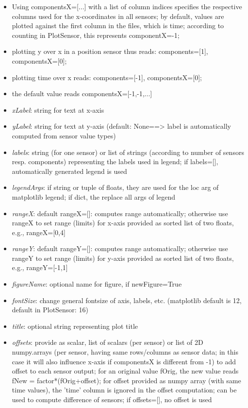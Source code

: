 \begin{itemize}[leftmargin=0.7cm]
\begin{itemize}[leftmargin=1.2cm]
\item[]Using componentsX=[...] with a list of column indices specifies the respective columns used for the x-coordinates in all sensors; by default, values are plotted against the first column in the files, which is time; according to counting in PlotSensor, this represents componentX=-1;
\item[]plotting y over x in a position sensor thus reads: components=[1], componentsX=[0];
\item[]plotting time over x reads: components=[-1], componentsX=[0];
\item[]the default value reads componentsX=[-1,-1,...]
\item[]{\it xLabel}: string for text at x-axis
\item[]{\it yLabel}: string for text at y-axis (default: None==> label is automatically computed from sensor value types)
\item[]{\it labels}: string (for one sensor) or list of strings (according to number of sensors resp. components) representing the labels used in legend; if labels=[], automatically generated legend is used
\item[]{\it legendArgs}: if string or tuple of floats, they are used for the loc arg of matplotlib legend; if dict, the replace all args of legend
\item[]{\it rangeX}: default rangeX=[]: computes range automatically; otherwise use rangeX to set range (limits) for x-axis provided as sorted list of two floats, e.g., rangeX=[0,4]
\item[]{\it rangeY}: default rangeY=[]: computes range automatically; otherwise use rangeY to set range (limits) for y-axis provided as sorted list of two floats, e.g., rangeY=[-1,1]
\item[]{\it figureName}: optional name for figure, if newFigure=True
\item[]{\it fontSize}: change general fontsize of axis, labels, etc. (matplotlib default is 12, default in PlotSensor: 16)
\item[]{\it title}: optional string representing plot title
\item[]{\it offsets}: provide as scalar, list of scalars (per sensor) or list of 2D numpy.arrays (per sensor, having same rows/columns as sensor data; in this case it will also influence x-axis if componentsX is different from -1) to add offset to each sensor output; for an original value fOrig, the new value reads fNew = factor*(fOrig+offset); for offset provided as numpy array (with same time values), the 'time' column is ignored in the offset computation; can be used to compute difference of sensors; if offsets=[], no offset is used

\end{itemize}
\end{itemize}
